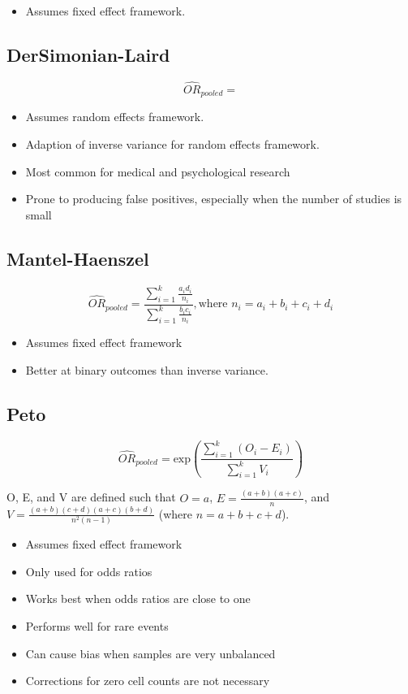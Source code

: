 \documentclass{article}
\begin{document}
\begin{itemize}
  \item Assumes fixed effect framework.
\end{itemize}

\subsection{DerSimonian-Laird}

\begin{equation}
    \hat{OR}_{pooled} =
\end{equation}

\begin{itemize}
  \item Assumes random effects framework.
  \item Adaption of inverse variance for random effects framework.
  \item Most common for medical and psychological research
  \item Prone to producing false positives, especially when the number of
  studies is small
\end{itemize}

\subsection{Mantel-Haenszel}

\begin{equation}
    \hat{OR}_{pooled} = \frac
    {\sum_{i=1}^k \frac{a_i d_i}{n_i}}
    {\sum_{i=1}^k \frac{b_i c_i}{n_i}},
    \text{where } n_i = a_i + b_i + c_i + d_i
\end{equation}

\begin{itemize}
  \item Assumes fixed effect framework
  \item Better at binary outcomes than inverse variance.
\end{itemize}

\subsection{Peto}

\begin{equation}
    \hat{OR}_{pooled} = \text{exp}
    (\frac{\sum_{i=1}^k (O_i - E_i)}{\sum_{i=1}^k V_i})
\end{equation}

O, E, and V are defined such that $O = a$, $E = \frac{(a+b)(a+c)}{n}$, and
$V = \frac{(a+b)(c+d)(a+c)(b+d)}{n^2(n-1)}$ (where $n = a+b+c+d$).

\begin{itemize}
  \item Assumes fixed effect framework
  \item Only used for odds ratios
  \item Works best when odds ratios are close to one
  \item Performs well for rare events
  \item Can cause bias when samples are very unbalanced
  \item Corrections for zero cell counts are not necessary
\end{itemize}
\end{document}

